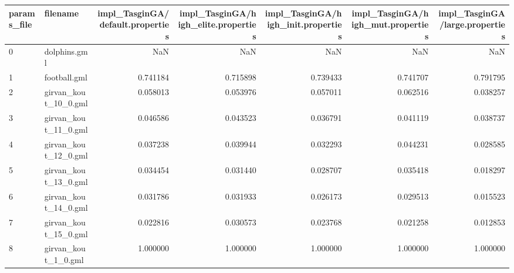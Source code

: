 \begin{tabular}{llrrrrr}
\toprule
params\_file &                    filename &  impl\_TasginGA/default.properties &  impl\_TasginGA/high\_elite.properties &  impl\_TasginGA/high\_init.properties &  impl\_TasginGA/high\_mut.properties &  impl\_TasginGA/large.properties \\
\midrule
0  &                dolphins.gml &                               NaN &                                  NaN &                                 NaN &                                NaN &                             NaN \\
1  &                football.gml &                          0.741184 &                             0.715898 &                            0.739433 &                           0.741707 &                        0.791795 \\
2  &        girvan\_kout\_10\_0.gml &                          0.058013 &                             0.053976 &                            0.057011 &                           0.062516 &                        0.038257 \\
3  &        girvan\_kout\_11\_0.gml &                          0.046586 &                             0.043523 &                            0.036791 &                           0.041119 &                        0.038737 \\
4  &        girvan\_kout\_12\_0.gml &                          0.037238 &                             0.039944 &                            0.032293 &                           0.044231 &                        0.028585 \\
5  &        girvan\_kout\_13\_0.gml &                          0.034454 &                             0.031440 &                            0.028707 &                           0.035418 &                        0.018297 \\
6  &        girvan\_kout\_14\_0.gml &                          0.031786 &                             0.031933 &                            0.026173 &                           0.029513 &                        0.015523 \\
7  &        girvan\_kout\_15\_0.gml &                          0.022816 &                             0.030573 &                            0.023768 &                           0.021258 &                        0.012853 \\
8  &         girvan\_kout\_1\_0.gml &                          1.000000 &                             1.000000 &                            1.000000 &                           1.000000 &                        1.000000 \\

\end{tabular}
